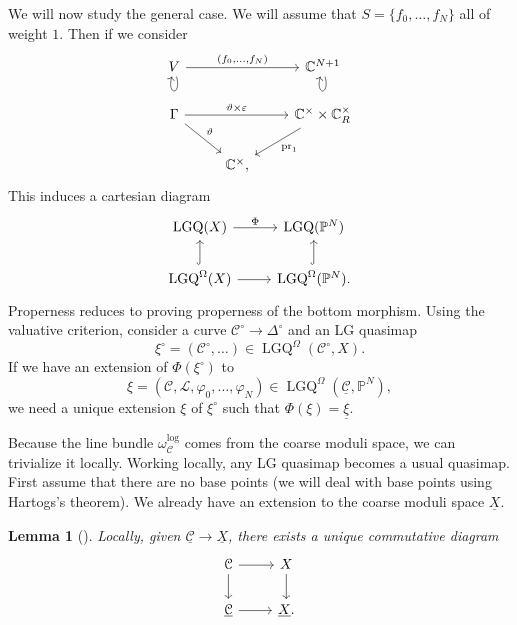 \documentclass[10pt]{amsart}
\newtheorem{lem}[thm]{Lemma}
\theoremstyle{definition}
\theoremstyle{remark}
\theoremstyle{plain}
\theoremstyle{definition}
\theoremstyle{remark}
\newcommand{\C}{\mathbb{C}}
\renewcommand{\P}{\mathbb{P}}
\newcommand{\ep}{\varepsilon}
\newcommand{\mc}[1]{\mathcal{#1}}
\newcommand{\mr}[1]{\mathrm{#1}}
\newcommand{\on}[1]{\operatorname{#1}}
\newcommand{\ul}[1]{\underline{#1}}
\newcommand{\1}{\mathbf{1}}
\newcommand{\2}{\mathbf{2}}
\newcommand{\3}{\mathbf{3}}
\begin{document}
We will now study the general case. We will assume that $S = \{f_0, \ldots, f_N \}$ all of weight $1$. Then if we consider
\begin{equation*}
\begin{tikzcd}
    V \ar{rr}{(f_0, \ldots, f_N)} \ar[loop below] & & \C^{N+1} \ar[loop below] \\
    \Gamma \ar{rr}{\vartheta \times \ep} \ar{dr}{\vartheta} & & \C^{\times} \times \C^{\times}_R \ar{dl}{\mr{pr}_1} \\
    & \C^{\times},
\end{tikzcd}
\end{equation*}
This induces a cartesian diagram
\begin{equation*}
\begin{tikzcd}
    \on{LGQ}(X) \ar{r}{\Phi} & \on{LGQ}(\P^N) \\
    \on{LGQ}^{\Omega}(X) \ar{r} \ar[hookrightarrow]{u} & \on{LGQ}^{\Omega}(\P^N)\ar[hookrightarrow]{u}.
\end{tikzcd}
\end{equation*}
Properness reduces to proving properness of the bottom morphism. Using the valuative criterion, consider a curve $\mc{C}^{\circ} \to \Delta^{\circ}$ and an LG quasimap
\[\xi^{\circ} = (\mc{C}^{\circ},\ldots) \in \on{LGQ}^{\Omega}(\mc{C}^{\circ}, X). \]
If we have an extension of $\Phi(\xi^{\circ})$ to
\[ \xi = (\mc{C}, \mc{L}, \varphi_0, \ldots, \varphi_N) \in \on{LGQ}^{\Omega}(\ul{ \mc{C} }, \P^N), \]
we need a unique extension $\xi$ of $\xi^{\circ}$ such that $\Phi(\xi) = \ul{\xi}$.

Because the line bundle $\omega_{\mc{C}}^{\log}$ comes from the coarse moduli space, we can trivialize it locally. Working locally, any LG quasimap becomes a usual quasimap. First assume that there are no base points (we will deal with base points using Hartogs's theorem). We already have an extension to the coarse moduli space $\ul{X}$.

\begin{lem}[\cite{av}]
    Locally, given $\ul{\mc{C}} \to \ul{X}$, there exists a unique commutative diagram
    \begin{equation*}
    \begin{tikzcd}
        \mc{C} \ar{r} \ar{d} & X \ar{d} \\
        \ul{\mc{C}} \ar{r} & \ul{X}.
    \end{tikzcd}
    \end{equation*}
\end{lem}
\end{document}
